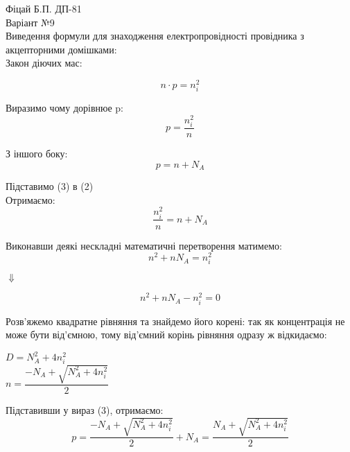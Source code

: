 \documentclass[a4paper,12pt]{article}
\begin{document}
\pagecolor{white}
Фіцай Б.П. ДП-81\\

Варіант №9\\

Виведення формули для знаходження електропровідності провідника з акцепторними домішками:\\

\large
Закон діючих мас:

\begin{equation}
n\cdot p = n_i^2
\label{eq:ref}
\end{equation}

Виразимо чому дорівнюе p:
\begin{equation}
p = \dfrac{n_i^2}{n}
\label{eq:ref}
\end{equation}

З іншого боку:
\begin{equation}
p = n+N_A
\label{eq:ref}
\end{equation}


Підставимо (3) в (2)\\

Отримаємо:
\begin{equation}
\dfrac{n_i^2}{n} = n+N_A
\label{eq:ref}
\end{equation}


Виконавши деякі нескладні математичні перетворення матимемо:
\begin{equation}
n^2 + nN_A = n_i^2
\label{eq:ref}
\end{equation}
\begin{center}
$ \Downarrow $
\end{center}
\begin{equation}
n^2 + nN_A -n_i^2=0
\label{eq:ref}
\end{equation}

Розв'яжемо квадратне рівняння та знайдемо його корені: так як концентрація не може бути від'ємною, тому
від'ємний корінь рівняння одразу ж відкидаємо:\\
\begin{center}
$D=N_A^2 + 4n_i^2$\\
\vspace{0.3cm}
$n= \dfrac{-N_A+ \sqrt{N_A^2 + 4n_i^2}}{2}$\\
\end{center}

Підставивши у вираз (3), отримаємо:
\begin{equation}
p= \dfrac{-N_A+ \sqrt{N_A^2 + 4n_i^2}}{2} +N_A=\dfrac{N_A+ \sqrt{N_A^2 + 4n_i^2}}{2}
\label{eq:ref}
\end{equation}
\end{document}
